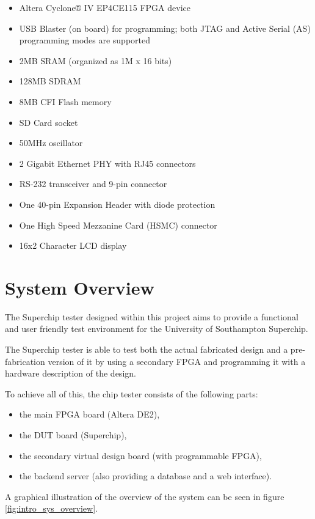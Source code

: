 \begin{itemize}
 \item Altera Cyclone® IV EP4CE115 FPGA device
 \item USB Blaster (on board) for programming; both JTAG and Active Serial (AS) programming modes are supported
 \item 2MB SRAM (organized as 1M x 16 bits)
 \item 128MB SDRAM
 \item 8MB CFI Flash memory
 \item SD Card socket
 \item 50MHz oscillator
 \item 2 Gigabit Ethernet PHY with RJ45 connectors
 \item RS-232 transceiver and 9-pin connector
 \item One 40-pin Expansion Header with diode protection
 \item One High Speed Mezzanine Card (HSMC) connector
 \item 16x2 Character LCD display
\end{itemize}




\section{System Overview}
The Superchip tester designed within this project aims to provide a functional
and user friendly test environment for the University of Southampton Superchip.

The Superchip tester is able to test both the actual fabricated design and
a pre-fabrication version of it by using a secondary FPGA and programming it with
a hardware description of the design.

To achieve all of this, the chip tester consists of the following parts:

\begin{itemize}
 \item the main FPGA board (Altera DE2),
 \item the DUT board (Superchip),
 \item the secondary virtual design board (with programmable FPGA),
 \item the backend server (also providing a database and a web interface).
\end{itemize}

A graphical illustration of the overview of the system can be seen in figure \ref{fig:intro_sys_overview}.


